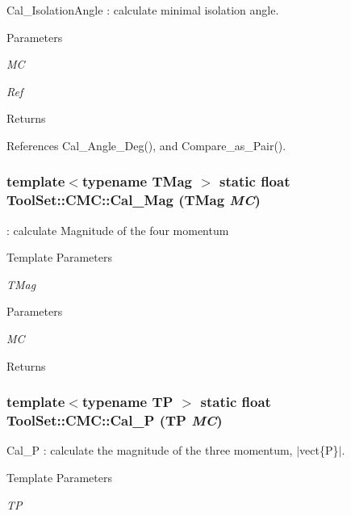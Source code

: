 Cal\_\-IsolationAngle : calculate minimal isolation angle. 
\begin{DoxyParams}{Parameters}
\item[{\em MC}]\item[{\em Ref}]\end{DoxyParams}
\begin{DoxyReturn}{Returns}

\end{DoxyReturn}


References Cal\_\-Angle\_\-Deg(), and Compare\_\-as\_\-Pair().\hypertarget{classToolSet_1_1CMC_acbada53a8416ca460d7aa07453610dc2}{
\subsubsection[{Cal\_\-Mag}]{\setlength{\rightskip}{0pt plus 5cm}template$<$typename TMag $>$ static float ToolSet::CMC::Cal\_\-Mag (TMag {\em MC})}}
\label{classToolSet_1_1CMC_acbada53a8416ca460d7aa07453610dc2}


: calculate Magnitude of the four momentum 
\begin{DoxyTemplParams}{Template Parameters}
\item[{\em TMag}]\end{DoxyTemplParams}

\begin{DoxyParams}{Parameters}
\item[{\em MC}]\end{DoxyParams}
\begin{DoxyReturn}{Returns}

\end{DoxyReturn}
\hypertarget{classToolSet_1_1CMC_ae7f67f1180165cedcc4cbeb4e114e5d1}{
\subsubsection[{Cal\_\-P}]{\setlength{\rightskip}{0pt plus 5cm}template$<$typename TP $>$ static float ToolSet::CMC::Cal\_\-P (TP {\em MC})}}
\label{classToolSet_1_1CMC_ae7f67f1180165cedcc4cbeb4e114e5d1}


Cal\_\-P : calculate the magnitude of the three momentum, $|$vect\{P\}$|$. 
\begin{DoxyTemplParams}{Template Parameters}
\item[{\em TP}]\end{DoxyTemplParams}

